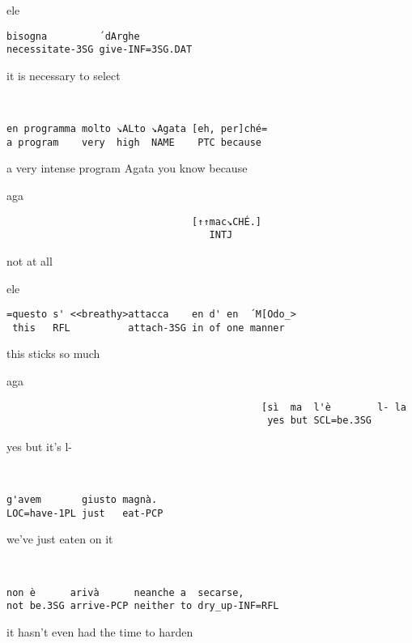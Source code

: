 \documentclass[output=paper,modfonts]{langscibook}
\begin{document}
\vspace{-1mm}
%
\begin{mdframednoverticalspace}[style=firstfoc]
\begin{transbox}{1}{ele}
\begin{verbatim}
bisogna         ´dArghe           
necessitate-3SG give-INF=3SG.DAT
\end{verbatim}
it is necessary to select
\end{transbox}
\end{mdframednoverticalspace}\vspace{1mm}
%
\begin{transbox}{2}{~}
\begin{verbatim}
en programma molto ↘ALto ↘Agata [eh, per]ché=
a program    very  high  NAME    PTC because
\end{verbatim}
a very intense program Agata you know because
\end{transbox}\vspace{0.75mm}
%
\begin{mdframednoverticalspace}[style=secondfoc]
\begin{transbox}{3}{aga}
\begin{verbatim}
                                [↑↑mac↘CHÉ.]                                                    
                                   INTJ
\end{verbatim}
\hspace{5.1cm} not at all
\end{transbox}
\end{mdframednoverticalspace}\vspace{2mm}
%
\begin{transbox}{4}{ele}
\begin{verbatim}
=questo s' <<breathy>attacca    en d' en  ´M[Odo_>
 this   RFL          attach-3SG in of one manner
\end{verbatim}
\hspace{0.07cm} this sticks so much
\end{transbox}\vspace{0.5mm}
%
\begin{transbox}{5}{aga}
\begin{verbatim}
                                            [sì  ma  l'è        l- la
                                             yes but SCL=be.3SG 
\end{verbatim}
\hspace{6.6cm} yes but it's l-
\end{transbox}
%
\begin{transbox}{6}{~}
\begin{verbatim}
g'avem       giusto magnà.
LOC=have-1PL just   eat-PCP
\end{verbatim}
we've just eaten on it
\end{transbox}
%
\begin{transbox}{6}{~}
\begin{verbatim}
non è      arivà      neanche a  secarse,
not be.3SG arrive-PCP neither to dry_up-INF=RFL
\end{verbatim}
it hasn't even had the time to harden
\end{transbox}\bigskip
\end{document}
